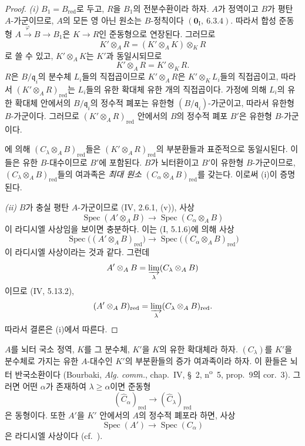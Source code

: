 \begin{proof}
\emph{(i)} $B_1=B_{\mathrm{red}}$로 두고, $R$을 $B_1$의 전분수환이라
하자. $A$가 정역이고 $B$가 평탄 $A$-가군이므로, $A$의 모든 영
아닌 원소는 $B$-정칙이다 $(\mathbf 0_{\mathrm I},~6.3.4)$.
따라서 합성 준동형 $A\xrightarrow{\varphi}B\to B_1$은
$K\to R$인 준동형으로 연장된다. 그러므로
\[
  K'\otimes_AR=(K'\otimes_AK)\otimes_KR
\]
로 쓸 수 있고, $K'\otimes_AK$는 $K'$과 동일시되므로
\[
  K'\otimes_AR=K'\otimes_KR.
\]
$R$은 $B/\mathfrak q_i$의 분수체 $L_i$들의 직접곱이므로
$K'\otimes_AR$은 $K'\otimes_KL_i$들의 직접곱이고, 따라서
$(K'\otimes_AR)_{\mathrm{red}}$는 $L_i$들의 유한 확대체 유한 개의
직접곱이다. 가정에 의해 $L_i$의 유한 확대체 안에서의
$B/\mathfrak q_i$의 정수적 폐포는 유한형
$(B/\mathfrak q_i)$-가군이고, 따라서 유한형 $B$-가군이다.
그러므로 $(K'\otimes_AR)_{\mathrm{red}}$ 안에서의 $B$의 정수적
폐포 $B'$은 유한형 $B$-가군이다.

에 의해
$(C_\lambda\otimes_AB)_{\mathrm{red}}$들은
$(K'\otimes_AR)_{\mathrm{red}}$의 부분환들과 표준적으로 동일시된다.
이들은 유한 $B$-대수이므로 $B'$에 포함된다. $B$가 뇌터환이고
$B'$이 유한형 $B$-가군이므로,
$(C_\lambda\otimes_AB)_{\mathrm{red}}$들의 여과족은
\emph{최대 원소} $(C_\alpha\otimes_AB)_{\mathrm{red}}$를 갖는다.
이로써 (i)이 증명된다.

\emph{(ii)} $B$가 충실 평탄 $A$-가군이므로 (IV, 2.6.1, (v)),
사상
\[
  \operatorname{Spec}(A'\otimes_AB)\longrightarrow
  \operatorname{Spec}(C_\alpha\otimes_AB)
\]
이 라디시엘 사상임을 보이면 충분하다. 이는 (I, 5.1.6)에 의해 사상
\[
  \operatorname{Spec}\bigl((A'\otimes_AB)_{\mathrm{red}}\bigr)
  \longrightarrow
  \operatorname{Spec}\bigl((C_\alpha\otimes_AB)_{\mathrm{red}}\bigr)
\]
이 라디시엘 사상이라는 것과 같다. 그런데
\[
  A'\otimes_AB=\varinjlim_\lambda(C_\lambda\otimes_AB)
\]
이므로 (IV, 5.13.2),
\[
  (A'\otimes_AB)_{\mathrm{red}}
  =\varinjlim_\lambda(C_\lambda\otimes_AB)_{\mathrm{red}}.
\]
따라서 결론은 (i)에서 따른다.
\end{proof}

\begin{corollary}[23.2.5]
\label{0.23.2.5-ko}
$A$를 뇌터 국소 정역, $K$를 그 분수체, $K'$을 $K$의 유한
확대체라 하자. $(C_\lambda)$를 $K'$을 분수체로 가지는 유한
$A$-대수인 $K'$의 부분환들의 증가 여과족이라 하자. 이 환들은 뇌터
반국소환이다 (Bourbaki, \emph{Alg. comm.}, chap.~IV, §~2,
n\textsuperscript{o}~5, prop.~9의 cor.~3). 그러면 어떤 $\alpha$가
존재하여 $\lambda\geq\alpha$이면 준동형
\[
  (\widehat C_\alpha)_{\mathrm{red}}
  \longrightarrow(\widehat C_\lambda)_{\mathrm{red}}
\]
은 동형이다. 또한 $A'$을 $K'$ 안에서의 $A$의 정수적 폐포라 하면,
사상
\[
  \operatorname{Spec}(A')\longrightarrow
  \operatorname{Spec}(C_\alpha)
\]
은 라디시엘 사상이다 (cf.~).
\end{corollary}

